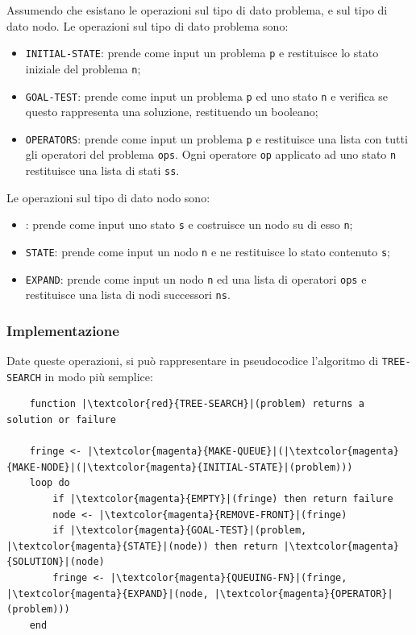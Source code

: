 \documentclass{article}
\numberwithin{equation}{subsection}
\begin{document}
Assumendo che esistano le operazioni sul tipo di dato problema, e sul tipo di dato nodo. Le 
operazioni sul tipo di dato problema sono:
\begin{itemize}
    \item \color{magenta}\verb|INITIAL-STATE|\color{black}: prende come input un problema \verb|p| e restituisce lo stato iniziale del problema \verb|n|;
    \item \color{magenta}\verb |GOAL-TEST|\color{black}: prende come input un problema \verb|p| ed uno stato \verb|n| e verifica se questo rappresenta una soluzione, restituendo un booleano;
    \item \color{magenta}\verb|OPERATORS|\color{black}: prende come input un problema \verb|p| e restituisce una lista con tutti gli operatori del problema \verb|ops|. Ogni operatore \verb|op| applicato ad uno stato \verb|n| restituisce una lista di stati \verb|ss|. 
\end{itemize}

Le operazioni sul tipo di dato nodo sono:
\begin{itemize}
    \item \color{magenta}{\verb|MAKE-NODE|}\color{black}: prende come input uno stato \verb|s| e costruisce un nodo su di esso \verb|n|;
    \item \color{magenta}\verb|STATE|\color{black}: prende come input un nodo \verb|n| e ne restituisce lo stato contenuto \verb|s|;
    \item \color{magenta}\verb|EXPAND|\color{black}: prende come input un nodo \verb|n| ed una lista di operatori \verb|ops| e restituisce una lista di nodi successori \verb|ns|. 
\end{itemize}

\subsubsection{Implementazione}

Date queste operazioni, si può rappresentare in pseudocodice l'algoritmo di \verb|TREE-SEARCH| in modo più 
semplice:
\begin{verbatim}
    function |\textcolor{red}{TREE-SEARCH}|(problem) returns a solution or failure

    fringe <- |\textcolor{magenta}{MAKE-QUEUE}|(|\textcolor{magenta}{MAKE-NODE}|(|\textcolor{magenta}{INITIAL-STATE}|(problem)))
    loop do
        if |\textcolor{magenta}{EMPTY}|(fringe) then return failure
        node <- |\textcolor{magenta}{REMOVE-FRONT}|(fringe)
        if |\textcolor{magenta}{GOAL-TEST}|(problem, |\textcolor{magenta}{STATE}|(node)) then return |\textcolor{magenta}{SOLUTION}|(node)
        fringe <- |\textcolor{magenta}{QUEUING-FN}|(fringe, |\textcolor{magenta}{EXPAND}|(node, |\textcolor{magenta}{OPERATOR}|(problem)))
    end
\end{verbatim}
\end{document}
